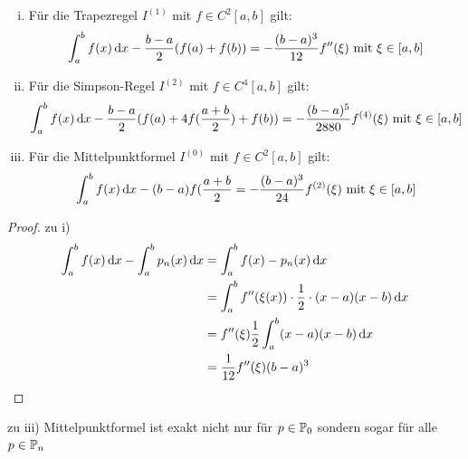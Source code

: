 \documentclass{../Skript}
\begin{document}
\begin{theorem}\hfill
    \begin{enumerate}[i)]
        \item Für die Trapezregel \(I^{(1)}\) mit \(f\in C^2[a,b]\) 
        gilt: \[
        \int^b_af(x)\mathop{}\!\mathrm{d} x-\frac{b-a}{2}(f(a)+f(b)) = -\frac{(b-
        a)^3}{12}f''(\xi) \text{ mit } \xi\in[a,b]
        \]
        \item Für die Simpson-Regel \(I^{(2)}\) mit \(f\in C^4[a,b]\) 
        gilt: \[
        \int^b_af(x)\mathop{}\!\mathrm{d} x-\frac{b-a}{2}(f(a)+4f(\frac{a+b}{2})+f(b)) 
        = 
        -\frac{(b-a)^5}{2880}f^{(4)}(\xi) \text{ mit } \xi\in[a,b]
        \]
        \item Für die Mittelpunktformel \(I^{(0)}\) mit \(f\in 
        C^2[a,b]\) gilt: \[
        \int^b_af(x)\mathop{}\!\mathrm{d} x-(b-a)f(\frac{a+b}{2} = -\frac{(b-
        a)^3}{24}f^{(2)}(\xi) \text{ mit } \xi\in[a,b]
        \]
    \end{enumerate}
\end{theorem}
\begin{proof}
    zu i) \begin{align*}
    \int^b_af(x) \mathop{}\!\mathrm{d} x - \int^b_a p_n(x) \mathop{}\!\mathrm{d} x &= \int^b_a f(x)-
    p_n(x) \mathop{}\!\mathrm{d} 
    x\\
    &=\int^b_a f''(\xi(x))\cdot \frac{1}{2}\cdot(x-a)(x-b)\mathop{}\!\mathrm{d} x\\
    &= f''(\xi)\frac{1}{2}\int^b_a(x-a)(x-b)\mathop{}\!\mathrm{d} x\\
    &= \frac{1}{12}f''(\xi)(b-a)^3
   \end{align*}
\end{proof}
\begin{remark}
    zu iii) Mittelpunktformel ist exakt nicht nur für \(p\in\mathbb{P}_0\) 
    sondern 
    sogar für alle \(p\in\mathbb{P}_n\)
\end{remark}
\end{document}
